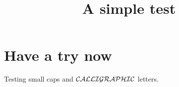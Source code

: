 \documentclass{article}
\title{A simple test}
\date{}
\begin{document}
\maketitle
\section{Have a try now}
Testing {\sc small caps} and $\cal CALLIGRAPHIC$ letters.
\end{document}
